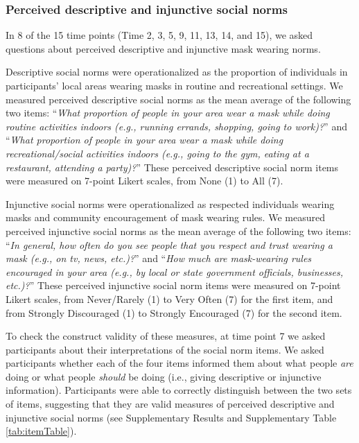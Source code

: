 \documentclass[
  english,
  man,floatsintext]{apa6}
\begin{document}
\hypertarget{perceived-descriptive-and-injunctive-social-norms}{%
\subsubsection{Perceived descriptive and injunctive social norms}\label{perceived-descriptive-and-injunctive-social-norms}}

In 8 of the 15 time points (Time 2, 3, 5, 9, 11, 13, 14, and 15), we asked questions about perceived descriptive and injunctive mask wearing norms.

Descriptive social norms were operationalized as the proportion of individuals in participants' local areas wearing masks in routine and recreational settings. We measured perceived descriptive social norms as the mean average of the following two items: ``\emph{What proportion of people in your area wear a mask while doing routine activities indoors (e.g., running errands, shopping, going to work)?}'' and ``\emph{What proportion of people in your area wear a mask while doing recreational/social activities indoors (e.g., going to the gym, eating at a restaurant, attending a party)?}'' These perceived descriptive social norm items were measured on 7-point Likert scales, from None (1) to All (7).

Injunctive social norms were operationalized as respected individuals wearing masks and community encouragement of mask wearing rules. We measured perceived injunctive social norms as the mean average of the following two items: ``\emph{In general, how often do you see people that you respect and trust wearing a mask (e.g., on tv, news, etc.)?}'' and ``\emph{How much are mask-wearing rules encouraged in your area (e.g., by local or state government officials, businesses, etc.)?}'' These perceived injunctive social norm items were measured on 7-point Likert scales, from Never/Rarely (1) to Very Often (7) for the first item, and from Strongly Discouraged (1) to Strongly Encouraged (7) for the second item.

To check the construct validity of these measures, at time point 7 we asked participants about their interpretations of the social norm items. We asked participants whether each of the four items informed them about what people \emph{are} doing or what people \emph{should} be doing (i.e., giving descriptive or injunctive information). Participants were able to correctly distinguish between the two sets of items, suggesting that they are valid measures of perceived descriptive and injunctive social norms (see Supplementary Results and Supplementary Table \ref{tab:itemTable}).
\end{document}
